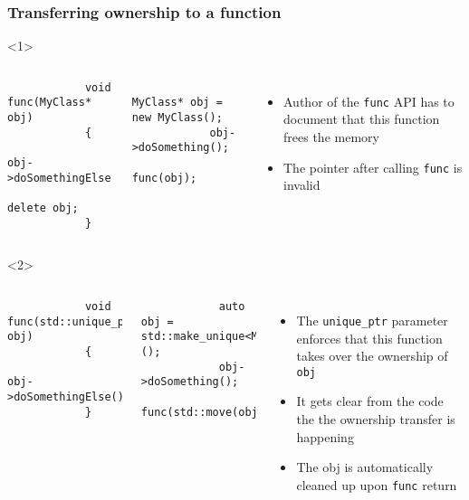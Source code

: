 \documentclass{beamer}
\begin{document}
\begin{frame}[fragile,t]
\frametitle{Transferring ownership to a function}
	\begin{onlyenv}
	\begin{columns}[T]
		\begin{lstlisting}
			void func(MyClass* obj)
			{
				obj->doSomethingElse();
				delete obj;
			}
		\end{lstlisting}
        \hrulefill
		\begin{lstlisting}
			MyClass* obj = new MyClass();
			obj->doSomething();
			func(obj);			
		\end{lstlisting}
		\begin{itemize}
			\item Author of the \texttt{func} API has to document that this function
				  frees the memory
			\item The pointer after calling \texttt{func} is invalid
		\end{itemize}
		
	\end{columns}
	\end{onlyenv}
	
	\begin{onlyenv}
	\begin{columns}[T]
		\begin{lstlisting}
			void func(std::unique_ptr<MyClass> obj)
			{
				obj->doSomethingElse();		
			}
		\end{lstlisting}
        \hrulefill
		\begin{lstlisting}
			auto obj = std::make_unique<MyClass>();
			obj->doSomething();
			func(std::move(obj));		
		\end{lstlisting}
		\begin{itemize}
			\item The \texttt{unique\_ptr} parameter enforces that this function takes
				  over the ownership of \texttt{obj}
			\item It gets clear from the code the the ownership transfer is happening
			\item The obj is automatically cleaned up upon \texttt{func} return
		\end{itemize}
	\end{columns}
	\end{onlyenv}
\end{frame}
\end{document}
